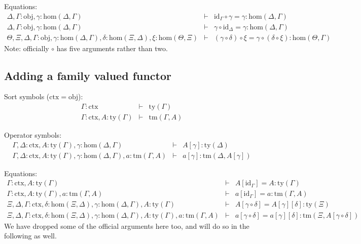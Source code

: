 \documentclass{lmcs}
\def\Obj{\mathrm{obj}}
\def\Hom{\mathrm{hom}}
\def\id{\mathrm{id}}
\newcommand{\ctx}{\mathrm{ctx}}
\newcommand{\ty}{\mathrm{ty}}
\newcommand{\tm}{\mathrm{tm}}
\begin{document}
Equations:
\begin{eqnarray*}
\Delta, \Gamma : \Obj, \gamma : \Hom(\Delta,\Gamma) &\vdash& \id_\Gamma \circ \gamma = \gamma : \Hom(\Delta,\Gamma)\\
\Delta, \Gamma : \Obj, \gamma : \Hom(\Delta,\Gamma) &\vdash& \gamma \circ \id_\Delta = \gamma : \Hom(\Delta,\Gamma)\\
\Theta, \Xi,\Delta,\Gamma : \Obj, \gamma : \Hom(\Delta,\Gamma), \delta : \Hom(\Xi,\Delta), \xi : \Hom(\Theta,\Xi) &\vdash&
(\gamma \circ \delta) \circ \xi = \gamma \circ (\delta \circ \xi): \Hom(\Theta,\Gamma)
\end{eqnarray*}
Note: officially $\circ$ has five arguments rather than two.

\subsection{Adding a family valued functor}
\hspace{1em}

Sort symbols ($\ctx = \Obj$):
\begin{eqnarray*}
\Gamma : \ctx &\vdash& \ty(\Gamma)\\
\Gamma : \ctx, A:\ty(\Gamma) &\vdash& \tm(\Gamma,A)
\end{eqnarray*}

Operator symbols:
\begin{eqnarray*}
\Gamma,\Delta : \ctx, A:\ty(\Gamma), \gamma : \Hom(\Delta,\Gamma) &\vdash&
A[\gamma] : \ty(\Delta)\\
\Gamma,\Delta : \ctx, A:\ty(\Gamma), \gamma : \Hom(\Delta,\Gamma), a:\tm(\Gamma,A) &\vdash&  a[\gamma] : \tm(\Delta,A[\gamma])
\end{eqnarray*}

Equations:
\begin{eqnarray*}
\Gamma : \ctx, A:\ty(\Gamma) &\vdash& A[\id_\Gamma] = A : \ty(\Gamma)\\
\Gamma : \ctx, A:\ty(\Gamma), a:\tm(\Gamma,A) &\vdash& a[\id_\Gamma] = a : \tm(\Gamma,A)\\
\Xi,\Delta,\Gamma : \ctx, \delta : \Hom(\Xi,\Delta), \gamma : \Hom(\Delta,\Gamma),
A:\ty(\Gamma) &\vdash& A[\gamma\circ\delta] = A[\gamma][\delta]: \ty(\Xi)\\
\Xi,\Delta,\Gamma : \ctx, \delta : \Hom(\Xi,\Delta), \gamma : \Hom(\Delta,\Gamma),
A:\ty(\Gamma), a:\tm(\Gamma,A) &\vdash&
a[\gamma\circ\delta] = a[\gamma][\delta]: \tm(\Xi,A[\gamma\circ\delta])
\end{eqnarray*}
We have dropped some of the official arguments here too, and will do so in the following as well.
\end{document}
